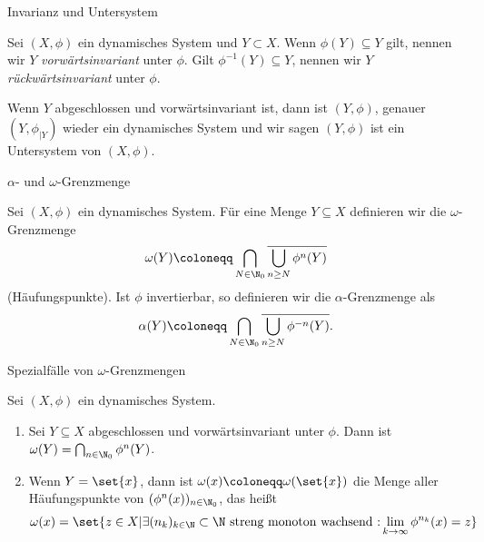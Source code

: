 \begin{definition}Invarianz und Untersystem

  Sei $(X, \phi)$ ein dynamisches System und $Y \subset X$. Wenn $\phi(Y) \subseteq Y$ gilt, nennen wir $Y$ \emph{vorwärtsinvariant} unter $\phi$. Gilt $\phi^{-1}(Y) \subseteq Y$, nennen wir $Y$ \emph{rückwärtsinvariant} unter $\phi$.

Wenn $Y$ abgeschlossen und vorwärtsinvariant ist, dann ist $(Y, \phi)$, genauer $\left( Y,\phi_{|Y}\right)$ wieder ein dynamisches System und wir sagen $(Y, \phi)$ ist ein Untersystem von $(X, \phi)$.
\end{definition}
\begin{definition} $\alpha$- und $\omega$-Grenzmenge

Sei $(X, \phi)$ ein dynamisches System. Für eine Menge $Y \subseteq X$ definieren wir die $\omega$-Grenzmenge 
\begin{align*}
  \omega(Y) \coloneqq \bigcap_{N \in \N_0} \overline{\bigcup_{n \geq N} \phi^n(Y)}
\end{align*}
(Häufungspunkte). Ist $\phi$ invertierbar, so definieren wir die $\alpha$-Grenzmenge als 
\begin{align*}
  \alpha(Y) \coloneqq \bigcap_{N \in \N_0} \overline{\bigcup_{n \geq N} \phi^{-n}(Y)}. 
\end{align*}
\end{definition}
\begin{lemma}\label{lem:spezial}Spezialfälle von $\omega$-Grenzmengen
  
Sei $(X, \phi)$ ein dynamisches System. 
\renewcommand{\labelenumi}{(\roman{enumi})}
\begin{enumerate} %
\item Sei $Y \subseteq X$ abgeschlossen und vorwärtsinvariant unter $\phi$. Dann ist $\omega(Y) = \bigcap_{n \in \N_0} \phi^n(Y)$.
\item Wenn $Y = \set{x}$, dann ist $\omega(x) \coloneqq \omega(\set{x})$ die Menge aller Häufungspunkte von $(\phi^n(x))_{n \in \N_0}$, das heißt
  \begin{align*}
    \omega(x) = \set{z \in X | \exists (n_k)_{k\in \N} \subset \N \text{ streng monoton wachsend :} \lim_{k \to \infty} \phi^{n_k}(x) = z}
  \end{align*}
\end{enumerate}
\end{lemma}
